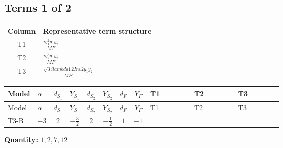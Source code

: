 \documentclass[8pt]{article}
\begin{document}
\begin{landscape}
\subsection*{Terms 1 of 2}
\begin{center}
\begin{tabular}{@{}c >{\raggedright\arraybackslash}p{0.82\linewidth}@{}}
\toprule
Column & Representative term structure \\
\midrule
T1 & \(\displaystyle \frac{i g_{1}^{2} \overline{y_{1}} \overline{y_{2}}}{MF}\) \\
\midrule
T2 & \(\displaystyle \frac{i g_{2}^{2} \overline{y_{1}} \overline{y_{2}}}{MF}\) \\
\midrule
T3 & \(\displaystyle \frac{\sqrt{3} i lambda12Inv2 \overline{y_{1}} \overline{y_{2}}}{MF}\) \\
\midrule
\bottomrule
\end{tabular}
\end{center}
\smallskip
\tiny
\begin{longtable}{@{}llcccccc >{\raggedright\arraybackslash}p{0.21\linewidth} >{\raggedright\arraybackslash}p{0.21\linewidth} >{\raggedright\arraybackslash}p{0.21\linewidth}@{}}
\toprule
Model & $\alpha$ & $d_{S_1}$ & $Y_{S_1}$ & $d_{S_2}$ & $Y_{S_2}$ & $d_F$ & $Y_F$ & T1 & T2 & T3 \\
\midrule
\endfirsthead
\toprule
Model & $\alpha$ & $d_{S_1}$ & $Y_{S_1}$ & $d_{S_2}$ & $Y_{S_2}$ & $d_F$ & $Y_F$ & T1 & T2 & T3 \\
\midrule
\endhead
T3-B & $-3$ & $2$ & $-\frac{3}{2}$ & $2$ & $-\frac{1}{2}$ & $1$ & $-1$ & \scriptsize\adjustbox{max width=\linewidth}{$\begin{gathered} - \frac{3 i g_{1}^{2} \overline{y_{1}} \overline{y_{2}}}{4 MF}\end{gathered}$} & \scriptsize\adjustbox{max width=\linewidth}{$\begin{gathered} - \frac{3 i g_{2}^{2} \overline{y_{1}} \overline{y_{2}}}{8 MF}\end{gathered}$} & \scriptsize\adjustbox{max width=\linewidth}{$\begin{gathered} - \frac{\sqrt{3} i lambda12Inv2 \overline{y_{1}} \overline{y_{2}}}{6 MF}\end{gathered}$} \\
\midrule
\bottomrule
\end{longtable}
\clearpage
\noindent\textbf{Quantity: }$\mathrm{1,2,7,12}$\par\smallskip

\end{landscape}
\end{document}
